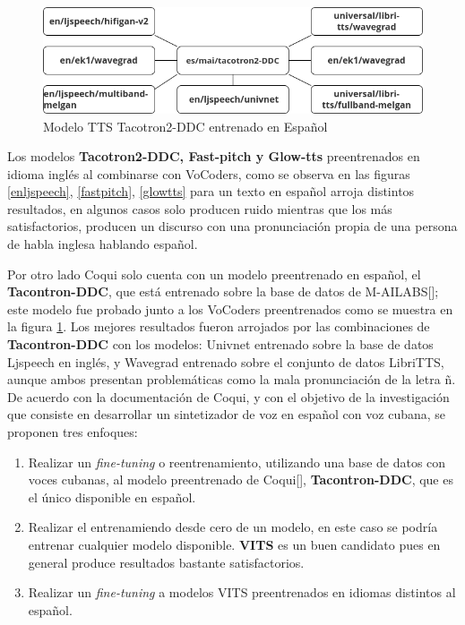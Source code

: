 \begin{figure}[H]
	\centering
	\includegraphics[width=0.7\linewidth]{Graphics/es_mai}
	\caption{Modelo TTS Tacotron2-DDC entrenado en Español}
	\label{esmai}
\end{figure}


Los modelos \textbf{Tacotron2-DDC, Fast-pitch y Glow-tts} preentrenados en idioma inglés al combinarse con VoCoders, como se observa en las figuras \ref{enljspeech}, \ref{fastpitch}, \ref{glowtts} para un texto en español arroja distintos resultados, en algunos casos solo producen ruido mientras que los más satisfactorios, producen un discurso con una pronunciación propia de una persona de habla inglesa hablando español.

Por otro lado Coqui solo cuenta con un modelo preentrenado en español, el \textbf{Tacontron-DDC}, que está entrenado sobre la base de datos de M-AILABS[\cite{mailabs}]; este modelo fue probado junto a los VoCoders preentrenados como se muestra en la figura \ref{esmai}. Los mejores resultados fueron arrojados por las combinaciones de \textbf{Tacontron-DDC} con los modelos: Univnet entrenado sobre la base de datos Ljspeech en inglés, y Wavegrad entrenado sobre el conjunto de datos LibriTTS, aunque ambos presentan problemáticas como la mala pronunciación de la letra ñ.\\

De acuerdo con la documentación de Coqui, y con el objetivo de la investigación que consiste en desarrollar un sintetizador de voz en español con voz cubana, se proponen tres enfoques:

\begin{enumerate}
	\item Realizar un \textit{fine-tuning} o reentrenamiento, utilizando una base de datos con voces cubanas, al modelo preentrenado de Coqui[\cite{coqui-doc}], \textbf{Tacontron-DDC}, que es el único disponible en español. 
	
	\item Realizar el entrenamiendo desde cero de un modelo, en este caso se podría entrenar cualquier modelo disponible. \textbf{VITS} es un buen candidato pues en general produce resultados bastante satisfactorios.
	
	\item Realizar un \textit{fine-tuning} a modelos VITS preentrenados en idiomas distintos al español.
	
	
	
\end{enumerate}

